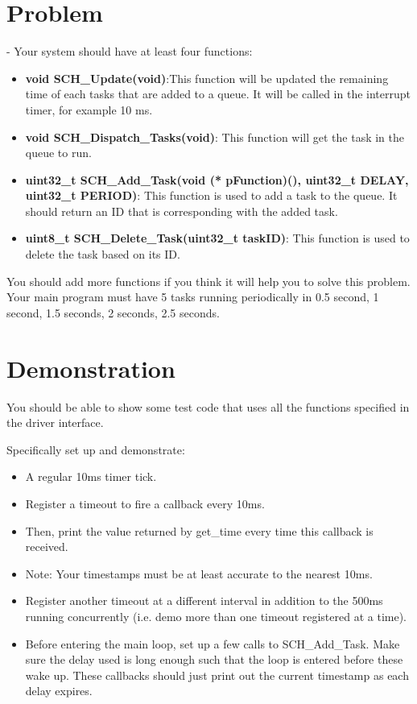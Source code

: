 \section{Problem}
   - Your system should have at least four functions:
   \begin{itemize}
       \item \textbf{void SCH\_Update(void)}:This function will be updated the remaining time of each tasks that are added to a queue. It will be called in the interrupt timer, for example 10 ms.
      \item \textbf{void SCH\_Dispatch\_Tasks(void)}: This function will get the task  in the queue to run. 
      \item \textbf{uint32\_t SCH\_Add\_Task(void (* pFunction)(), uint32\_t DELAY, uint32\_t PERIOD)}: This function is used to add a task to the queue. It should return an ID that is corresponding with the added task. 
       \item \textbf{uint8\_t SCH\_Delete\_Task(uint32\_t taskID)}: This function is used to delete the task based on its ID. 

   \end{itemize}

You should add more functions if you think it will help you to solve this problem. 
Your main program must have 5 tasks running periodically in 0.5 second, 1 second, 1.5 seconds, 2 seconds, 2.5 seconds. 

\section{Demonstration}

You should be able to show some test code that uses all the functions specified in the driver interface.

Specifically set up and demonstrate:
\begin{itemize}
    \item A regular 10ms timer tick. 
    \item Register a timeout to fire a callback every 10ms.     
    \item Then, print the value returned by get\_time every time this callback is received. 
     \item Note: Your timestamps must be at least accurate to the nearest 10ms.
     \item Register another timeout at a different interval in addition to the 500ms running concurrently (i.e. demo more than one timeout registered at a time).
     \item Before entering the main loop, set up a few calls to SCH\_Add\_Task. Make sure the delay used is long enough such that the loop is entered before these wake up. These callbacks should just print out the current timestamp as each delay expires.

\end{itemize}




